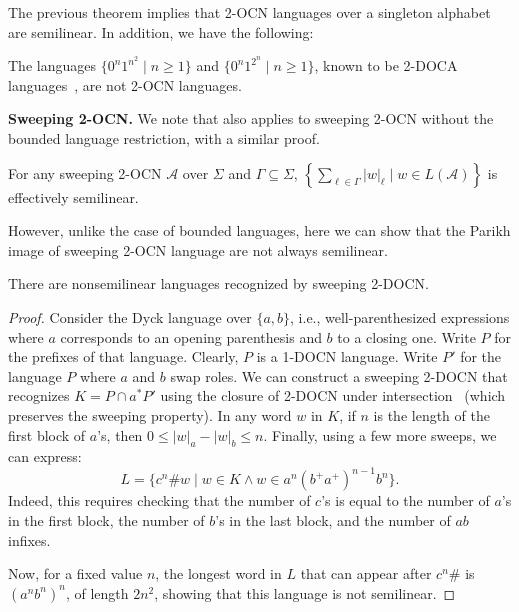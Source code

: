 \documentclass[USenglish]{lipics-v2021}
\newcommand{\shtodo}[1]{\todo[color=cyan!25,size=\small]{SH: #1}}
\newcommand{\cA}{\mathcal{A}}
\newcommand{\mysubparagraph}[1]{\noindent \textbf{\textsf{#1}} }
\begin{document}
The previous theorem implies that 2-OCN languages over a singleton alphabet are
semilinear. In addition, we have the following:
\begin{corollary}
	\label{cor:2DOCA_not_2OCN}
	The languages \(\{0^n 1^{n^2} \mid n \geq 1\}\) and \(\{0^n1^{2^n} \mid n \geq 1 \}\), known
	to be 2-DOCA languages~\cite{petersen1994two}, are not 2-OCN languages.
\end{corollary}

\mysubparagraph{Sweeping 2-OCN.} 
We note that  also applies to sweeping 2-OCN without the bounded language restriction, with a similar proof. 
\begin{theorem}
	\label{thm:singleton_alphabet_semilinear_sweeping} For any sweeping 2-OCN $\cA$ over $\Sigma$ and \(\Gamma \subseteq \Sigma\), $\left\{ \sum_{\ell \in \Gamma}
	|w|_\ell \mid w \in L(\cA)\right\}$ is effectively semilinear.
\end{theorem}
However, unlike the case of bounded languages, here we can show that the Parikh image of sweeping 2-OCN language are not always semilinear.
\begin{proposition}
	\label{prop:non_semilinear_sweeping}
	There are nonsemilinear languages recognized by sweeping 2-DOCN.
\end{proposition}
\begin{proof}
	Consider the Dyck language over \(\{a, b\}\), i.e., well-parenthesized
	expressions where \(a\) corresponds to an opening parenthesis and \(b\) to a
	closing one.  Write \(P\) for the prefixes of that language.  Clearly, \(P\) is a
	1-DOCN language.  Write \(P'\) for the language \(P\) where \(a\) and \(b\) swap
	roles.  We can construct a sweeping 2-DOCN that recognizes \(K = P \cap a^*P'\)
	using the closure of 2-DOCN under intersection~\cite{miyano1982two} (which preserves the sweeping property).  
	In any word \(w\) in \(K\), if \(n\) is the length of the first block of
	\(a\)'s, then \(0 \leq |w|_a - |w|_b \leq n\).  Finally, using a few more sweeps, we can
	express:
	\[
	L = \{c^n \# w \mid w \in K \land w \in a^n(b^+a^+)^{n-1}b^n \}.
	\]
	Indeed, this requires checking that the number of $c$'s is equal to the number
	of $a$'s in the first block, the number of $b$'s in the last block, and the
	number of $ab$ infixes.
	
	Now, for a fixed value \(n\), the longest word in \(L\) that can appear after \(c^n\#\) is
	\((a^nb^n)^n\), of length \(2n^2\), showing that this language is not semilinear.
\end{proof}
\end{document}
